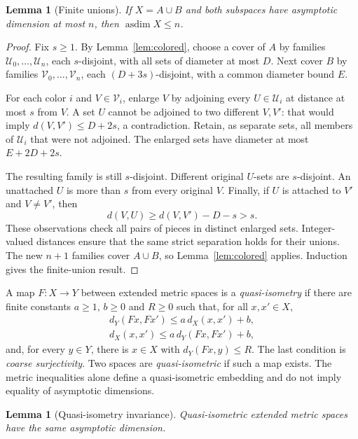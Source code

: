 \documentclass[11pt,letterpaper]{article}
\newtheorem{lemma}[theorem]{Lemma}
\theoremstyle{definition}
\DeclareMathOperator{\asdim}{asdim}
\newcommand{\cU}{\mathcal U}
\newcommand{\cV}{\mathcal V}
\begin{document}
\begin{lemma}[Finite unions]\label{lem:finite-union}
If $X=A\cup B$ and both subspaces have asymptotic dimension at most $n$,
then $\asdim X\le n$.
\end{lemma}

\begin{proof}
Fix $s\ge1$. By Lemma~\ref{lem:colored}, choose a cover of $A$ by families
$\cU_0,\ldots,\cU_n$, each $s$-disjoint, with all sets of diameter at most
$D$. Next cover $B$ by families $\cV_0,\ldots,\cV_n$, each
$(D+3s)$-disjoint, with a common diameter bound $E$.

For each color $i$ and $V\in\cV_i$, enlarge $V$ by adjoining every
$U\in\cU_i$ at distance at most $s$ from $V$. A set $U$ cannot be adjoined
to two different $V,V'$: that would imply
$d(V,V')\le D+2s$, a contradiction. Retain, as separate sets, all members
of $\cU_i$ that were not adjoined. The enlarged sets have diameter at most
$E+2D+2s$.

The resulting family is still $s$-disjoint. Different original $U$-sets
are $s$-disjoint. An unattached $U$ is more than $s$ from every original
$V$. Finally, if $U$ is attached to $V'$ and $V\ne V'$, then
\[
 d(V,U)\ge d(V,V')-D-s>s.
\]
These observations check all pairs of pieces in distinct enlarged sets.
Integer-valued distances ensure that the same strict separation holds
for their unions. The new $n+1$ families cover $A\cup B$, so
Lemma~\ref{lem:colored} applies. Induction gives the finite-union result.
\end{proof}

A map $F:X\to Y$ between extended metric spaces is a
\emph{quasi-isometry} if there are finite constants $a\ge1$, $b\ge0$
and $R\ge0$ such that, for all $x,x'\in X$,
\[
 \begin{aligned}
 d_Y(Fx,Fx')\le a\,d_X(x,x')+b,\\
 d_X(x,x')\le a\,d_Y(Fx,Fx')+b,
 \end{aligned}
\]
and, for every $y\in Y$, there is $x\in X$ with $d_Y(Fx,y)\le R$.
The last condition is \emph{coarse surjectivity}. Two spaces are
\emph{quasi-isometric} if such a map exists. The metric inequalities
alone define a quasi-isometric embedding and do not imply equality of
asymptotic dimensions.

\begin{lemma}[Quasi-isometry invariance]\label{lem:qi}
Quasi-isometric extended metric spaces have the same asymptotic dimension.
\end{lemma}
\end{document}
